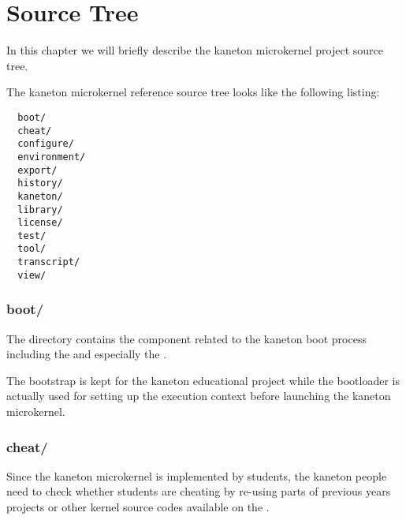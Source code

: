 %
%
%
%
%
%

%
%

\chapter{Source Tree}
\label{chapter:source tree}

In this chapter we will briefly describe the kaneton microkernel project
source tree.

\newpage

%
%

The kaneton microkernel reference source tree looks like the following
listing:

\begin{verbatim}
  boot/
  cheat/
  configure/
  environment/
  export/
  history/
  kaneton/
  library/
  license/
  test/
  tool/
  transcript/
  view/
\end{verbatim}

%
%

\subsection*{boot/}

The  directory contains the component related to the kaneton
boot process including the  and especially the
.

The bootstrap is kept for the kaneton educational project while the bootloader
is actually used for setting up the execution context before launching
the kaneton microkernel.

%
%

\subsection*{cheat/}

Since the kaneton microkernel is implemented by students, the kaneton
people need to check whether students are cheating by re-using parts of
previous years projects or other kernel source codes available on the
.

